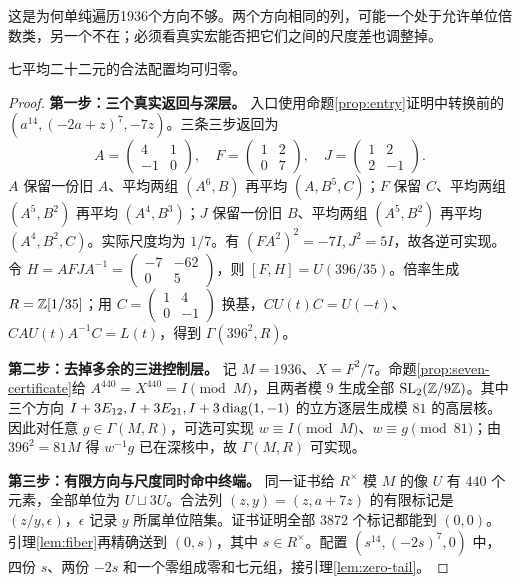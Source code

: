 这是为何单纯遍历1936个方向不够。两个方向相同的列，可能一个处于允许单位倍数类，另一个不在；必须看真实宏能否把它们之间的尺度差也调整掉。
\begin{lemma}[七平均二十二元的方向与尺度]\label{lem:seven22}
七平均二十二元的合法配置均可归零。
\end{lemma}
\begin{proof}

\par\noindent\textbf{第一步：三个真实返回与深层。}
入口使用命题\ref{prop:entry}证明中转换前的 $(a^{14},(-2a+z)^7,-7z)$。三条三步返回为
\[
A=\begin{pmatrix}4&1\\-1&0\end{pmatrix},\quad
F=\begin{pmatrix}1&2\\0&7\end{pmatrix},\quad
J=\begin{pmatrix}1&2\\2&-1\end{pmatrix}.
\]
$A$ 保留一份旧 $A$、平均两组 $(A^6,B)$ 再平均 $(A,B^5,C)$；$F$ 保留 $C$、平均两组 $(A^5,B^2)$ 再平均 $(A^4,B^3)$；$J$ 保留一份旧 $B$、平均两组 $(A^5,B^2)$ 再平均 $(A^4,B^2,C)$。实际尺度均为 $1/7$。有 $(FA^2)^2=-7I,J^2=5I$，故各逆可实现。
令 $H=AFJA^{-1}=\left(\begin{smallmatrix}-7&-62\\0&5\end{smallmatrix}\right)$，则 $[F,H]=U(396/35)$。倍率生成 $R=\mathbb Z[1/35]$；用 $C=\left(\begin{smallmatrix}1&4\\0&-1\end{smallmatrix}\right)$ 换基，$CU(t)C=U(-t)$、$CAU(t)A^{-1}C=L(t)$，得到 $\Gamma(396^2,R)$。

\par\noindent\textbf{第二步：去掉多余的三进控制层。}
记 $M=1936$、$X=F^2/7$。命题\ref{prop:seven-certificate}给 $A^{440}=X^{440}=I\pmod M$，且两者模 $9$ 生成全部 $\operatorname{SL}_2(\mathbb Z/9\mathbb Z)$。其中三个方向 $I+3E_{12},I+3E_{21},I+3\operatorname{diag}(1,-1)$ 的立方逐层生成模 $81$ 的高层核。因此对任意 $g\in\Gamma(M,R)$，可选可实现 $w\equiv I\pmod M$、$w\equiv g\pmod{81}$；由 $396^2=81M$ 得 $w^{-1}g$ 已在深核中，故 $\Gamma(M,R)$ 可实现。

\par\noindent\textbf{第三步：有限方向与尺度同时命中终端。}
同一证书给 $R^\times$ 模 $M$ 的像 $U$ 有 $440$ 个元素，全部单位为 $U\sqcup3U$。合法列 $(z,y)=(z,a+7z)$ 的有限标记是 $(z/y,\epsilon)$，$\epsilon$ 记录 $y$ 所属单位陪集。证书证明全部 $3872$ 个标记都能到 $(0,0)$。引理\ref{lem:fiber}再精确送到 $(0,s)$，其中 $s\in R^\times$。配置 $(s^{14},(-2s)^7,0)$ 中，四份 $s$、两份 $-2s$ 和一个零组成零和七元组，接引理\ref{lem:zero-tail}。
\end{proof}

